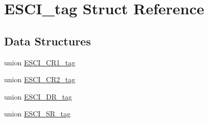 \hypertarget{structESCI__tag}{}\section{E\+S\+C\+I\+\_\+tag Struct Reference}
\label{structESCI__tag}
\subsection*{Data Structures}
\begin{DoxyCompactItemize}
\item 
union \mbox{\hyperlink{unionESCI__tag_1_1ESCI__CR1__tag}{E\+S\+C\+I\+\_\+\+C\+R1\+\_\+tag}}
\item 
union \mbox{\hyperlink{unionESCI__tag_1_1ESCI__CR2__tag}{E\+S\+C\+I\+\_\+\+C\+R2\+\_\+tag}}
\item 
union \mbox{\hyperlink{unionESCI__tag_1_1ESCI__DR__tag}{E\+S\+C\+I\+\_\+\+D\+R\+\_\+tag}}
\item 
union \mbox{\hyperlink{unionESCI__tag_1_1ESCI__SR__tag}{E\+S\+C\+I\+\_\+\+S\+R\+\_\+tag}}
\end{DoxyCompactItemize}
